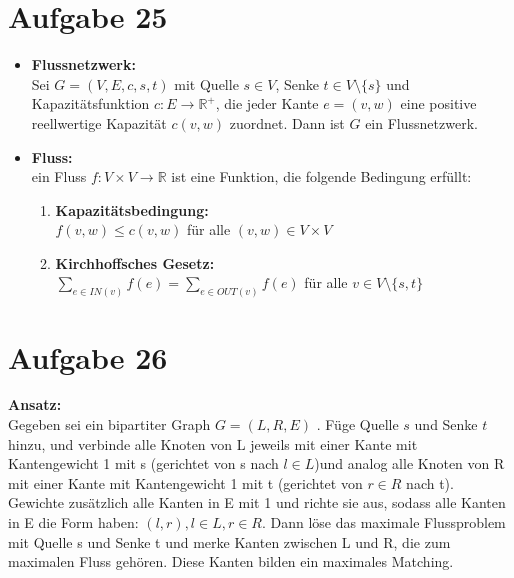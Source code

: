 \documentclass[10pt,a4paper]{article}
\begin{document}
\section*{Aufgabe 25}

    \begin{itemize}
        
        \item \textbf{Flussnetzwerk:}\\
        Sei $G = (V,E,c,s,t) $ mit Quelle $s \in  V$, Senke $t \in V \setminus \{s\}$ und
        Kapazitätsfunktion $c : E \rightarrow \mathbb{R}^+$, die jeder Kante $ e = (v,w)$ eine
        positive reellwertige Kapazität $c(v,w)$ zuordnet. Dann ist $G$ ein Flussnetzwerk.
        
        \item \textbf{Fluss:}\\
            ein Fluss $f : V \times V \rightarrow \mathbb{R}$ ist eine Funktion, die
            folgende Bedingung erfüllt:
            \begin{enumerate}
                \item \textbf{Kapazitätsbedingung:}
                    \\ $f(v,w) \leq c(v,w) $ für alle $(v,w) \in V \times V$
                    
                \item \textbf{Kirchhoffsches Gesetz:}
                    \\$\sum\limits_{e \in IN(v)} f(e) = \sum\limits_{e \in OUT(v)} f(e)$
                    für alle $v \in V \setminus \{s,t\} $
            \end{enumerate}
    
    \end{itemize}
    
            
\section*{Aufgabe 26}

    \textbf{Ansatz:} \\
    Gegeben sei ein bipartiter Graph $G = (L,R,E)$ . Füge Quelle $s$ und Senke $t$
    hinzu, und verbinde alle Knoten von L jeweils mit einer Kante mit Kantengewicht 1 mit s
    (gerichtet von s nach $l \in L$)und
    analog alle Knoten von R mit einer Kante mit Kantengewicht 1 mit t (gerichtet von $r \in R$ nach t).
    Gewichte zusätzlich alle Kanten in E mit 1 und richte sie aus, sodass alle
    Kanten in E die Form haben: $ (l,r), l\in L, r \in R$. Dann löse das maximale Flussproblem
    mit Quelle s und Senke t und merke Kanten zwischen L und R, die zum maximalen Fluss
    gehören. Diese Kanten bilden ein maximales Matching.
\end{document}
